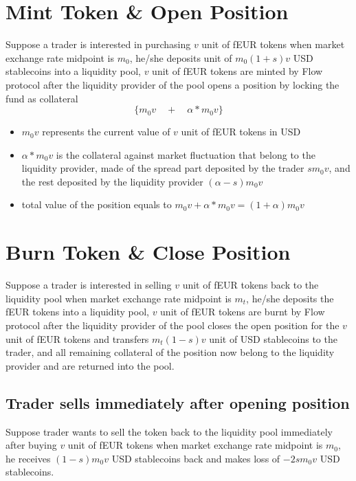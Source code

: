 \documentclass{article}
\begin{document}
\section{Mint Token \& Open Position}
Suppose a trader is interested in purchasing $v$ unit of fEUR tokens when market exchange rate midpoint is $m_0$, he/she deposits unit of $m_0(1+s)v$ USD stablecoins into a liquidity pool, $v$ unit of fEUR tokens are minted by Flow protocol after the liquidity provider of the pool opens a position by locking the fund as collateral
$$\{ m_0v  \quad +  \quad \alpha*m_0v \}$$

\begin{itemize}
    
    \item $m_0v$ represents the current value of $v$ unit of fEUR tokens in USD
    
    \item $\alpha*m_0 v$ is the collateral against market fluctuation that belong to the liquidity provider, made of the spread part deposited by the trader $ s m_0 v$, and the rest deposited by the liquidity provider $(\alpha-s)m_0v$
   
    \item total value of the position equals to  $m_0v + \alpha*m_0v = (1+\alpha)m_0 v$

\end{itemize}

\section{Burn Token \& Close Position}
Suppose a trader is interested in selling $v$ unit of fEUR tokens back to the liquidity pool when market exchange rate midpoint is $m_t$, he/she deposits the fEUR tokens into a liquidity pool, $v$ unit of fEUR tokens are burnt by Flow protocol after the liquidity provider of the pool closes the open position for the $v$ unit of fEUR tokens and transfers $m_t(1-s)v$ unit of USD stablecoins to the trader, and all remaining collateral of the position now belong to the liquidity provider and are returned into the pool. 

\subsection{Trader sells immediately after opening position}
Suppose trader wants to sell the token back to the liquidity pool immediately after buying $v$ unit of fEUR tokens when market exchange rate midpoint is $m_0$, he receives $(1-s)m_0 v$ USD stablecoins back and makes loss of $-2s m_0 v$ USD stablecoins. \par
\end{document}
